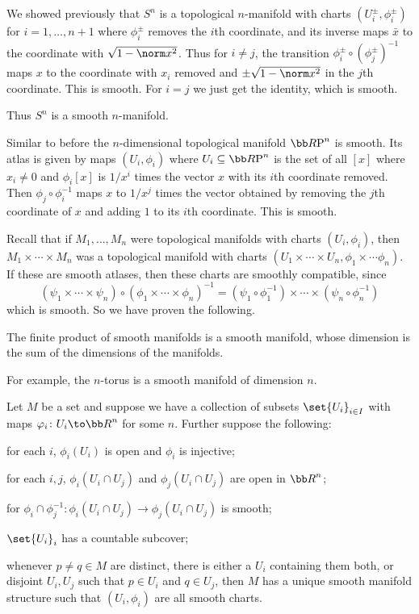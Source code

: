 \eexam

\bexam

    We showed previously that $S^n$ is a topological $n$-manifold with charts $(U_i^\pm,\phi_i^\pm)$ for $i=1,\dots,n+1$ where
    $\phi_i^\pm$ removes the $i$th coordinate, and its inverse maps $\bar x$ to the coordinate with $\sqrt{1-\norm x^2}$.
    Thus for $i\neq j$, the transition $\phi_i^\pm\circ(\phi_j^\pm)^{-1}$ maps $x$ to the coordinate with $x_i$ removed and
    $\pm\sqrt{1-\norm x^2}$ in the $j$th coordinate.
    This is smooth.
    For $i=j$ we just get the identity, which is smooth.

    Thus $S^n$ is a smooth $n$-manifold.

\eexam

\bexam

    Similar to before the $n$-dimensional topological manifold $\RP^n$ is smooth.
    Its atlas is given by maps $(U_i,\phi_i)$ where $U_i\subseteq\RP^n$ is the set of all $[x]$ where $x_i\neq0$ and
    $\phi_i[x]$ is $1/x^i$ times the vector $x$ with its $i$th coordinate removed.
    Then $\phi_j\circ\phi_i^{-1}$ maps $x$ to $1/x^j$ times the vector obtained by removing the $j$th coordinate of $x$ and adding
    $1$ to its $i$th coordinate.
    This is smooth.

\eexam

Recall that if $M_1,\dots,M_n$ were topological manifolds with charts $(U_i,\phi_i)$, then $M_1\times\cdots\times M_n$ was a topological
manifold with charts $(U_1\times\cdots\times U_n,\phi_1\times\cdots\phi_n)$.
If these are smooth atlases, then these charts are smoothly compatible, since
$$ (\psi_1\times\cdots\times\psi_n)\circ(\phi_1\times\cdots\times\phi_n)^{-1} = (\psi_1\circ\phi_1^{-1})\times\cdots\times(\psi_n\circ\phi_n^{-1}) $$
which is smooth.
So we have proven the following.

\bprop

    The finite product of smooth manifolds is a smooth manifold, whose dimension is the sum of the dimensions of the manifolds.

\eprop

For example, the $n$-torus is a smooth manifold of dimension $n$.

\blemm

    Let $M$ be a set and suppose we have a collection of subsets $\set{U_i}_{i\in I}$ with maps $\phi_i\colon U_i\to\bR^n$
    for some $n$.
    Further suppose the following:
    \benum
        \item for each $i$, $\phi_i(U_i)$ is open and $\phi_i$ is injective;
        \item for each $i,j$, $\phi_i(U_i\cap U_j)$ and $\phi_j(U_i\cap U_j)$ are open in $\bR^n$;
        \item for $\phi_i\cap\phi_j^{-1}\colon\phi_i(U_i\cap U_j)\to\phi_j(U_i\cap U_j)$ is smooth;
        \item $\set{U_i}_i$ has a countable subcover;
        \item whenever $p\neq q\in M$ are distinct, there is either a $U_i$ containing them both, or disjoint $U_i,U_j$ such that
        $p\in U_i$ and $q\in U_j$,
    \eenum
    then $M$ has a unique smooth manifold structure such that $(U_i,\phi_i)$ are all smooth charts.

